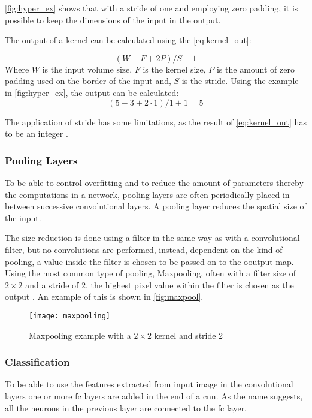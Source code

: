 \autoref{fig:hyper_ex} shows that with a stride of one and employing zero padding, it is possible to keep the dimensions of the input in the output.

The output of a kernel can be calculated using the \autoref{eq:kernel_out}:

\begin{equation}\label{eq:kernel_out}
	(W-F+2P)/S+1
\end{equation}
Where $ W $ is the input volume size, $F$ is the kernel size, $P$ is the amount of zero padding used on the border of the input and, $S$ is the stride. Using the example in \autoref{fig:hyper_ex}, the output can be calculated: 
\begin{equation}
(5-3+2\cdot1)/1+1=5
\end{equation}

The application of stride has some limitations, as the result of \autoref{eq:kernel_out} has to be an integer \citep{Karpathy2016b}.\\

\subsubsection{Pooling Layers}
To be able to control overfitting and to reduce the amount of parameters thereby the computations in a network, pooling layers are often periodically placed in-between successive convolutional layers. A pooling layer reduces the spatial size of the input.

The size reduction is done using a filter in the same way as with a convolutional filter, but no convolutions are performed, instead, dependent on the kind of pooling, a value inside the filter is chosen to be passed on to the ooutput map. Using the most common type of pooling, Maxpooling, often with a filter size of $2\times2$ and a stride of 2, the highest pixel value within the filter is chosen as the output \citep{Karpathy2016b}. An example of this is shown in \autoref{fig:maxpool}.

\begin{figure}[H]
	\centering
	\texttt{[image: maxpooling]}
	\caption{Maxpooling example with a $2\times2$ kernel and stride 2 \citep{Karpathy2016b}}
	\label{fig:maxpool}
\end{figure}

\subsubsection{Classification}
To be able to use the features extracted from input image in the convolutional layers one or more \gls{fc} layers are added in the end of a \gls{cnn}. As the name suggests, all the neurons in the previous layer are connected to the \gls{fc} layer.

